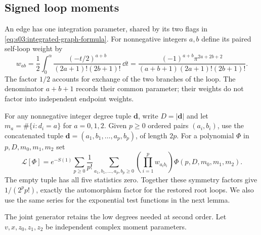 \subsection{Signed loop moments}
\label{subsec:s04:01}

An edge has one integration parameter, shared by its two flags in
\eqref{eq:s03:integrated-graph-formula}. For nonnegative integers
$a,b$ define its paired self-loop weight by
\begin{equation}\label{eq:s04:paired-weight}
 w_{ab}=\frac12\int_0^\alpha
       \frac{(-t/2)^{a+b}}{(2a+1)!(2b+1)!}\,\dd t
 =\frac{(-1)^{a+b}\pi^{2a+2b+2}}
       {(a+b+1)(2a+1)!(2b+1)!}.
\end{equation}
The factor $1/2$ accounts for exchange of the two branches of the loop.
The denominator $a+b+1$ records their common parameter; their weights do not factor
into independent endpoint weights.

For any nonnegative integer degree tuple $\mathbf d$, write
$D=|\mathbf d|$ and let
$m_a=\#\{i:d_i=a\}$ for $a=0,1,2$. Given $p\geq0$ ordered pairs
$(a_i,b_i)$, use the concatenated tuple
$\mathbf d=(a_1,b_1,\ldots,a_p,b_p)$, of length $2p$.
For a polynomial $\Phi$ in $p,D,m_0,m_1,m_2$ set
\begin{equation}\label{eq:s04:loop-functional}
 \mathcal L[\Phi]=e^{-S(1)}\sum_{p\geq0}\frac1{p!}
 \sum_{a_1,b_1,\ldots,a_p,b_p\geq0}
   \left(\prod_{i=1}^p w_{a_i b_i}\right)
       \Phi(p,D,m_0,m_1,m_2).
\end{equation}
The empty tuple has all five statistics zero. Together these symmetry
factors give $1/(2^pp!)$, exactly the automorphism factor for the
restored root loops. We also use the same series for the exponential
test functions in the next lemma.

The joint generator retains the low degrees needed at second order.
Let $v,x,z_0,z_1,z_2$ be independent complex moment parameters.

